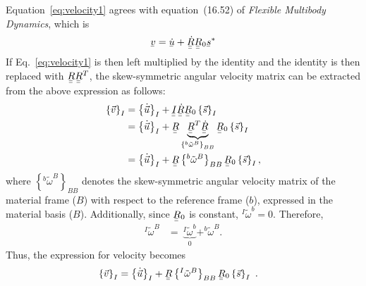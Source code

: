 \documentclass[a4paper]{article}
\newcommand{\ubar}[1]{\underaccent{\bar}{#1}}
\begin{document}
Equation~\eqref{eq:velocity1} agrees with equation~(16.52) of \textit{Flexible Multibody Dynamics}, which is
\begin{align}
  \ubar{v} = \ubar{\dot{u}} + \ubar{\ubar{\dot{R}}} \ubar{\ubar{R}}_{0} \ubar{s}^{*}
  \label{eq:16521}
\end{align}
If Eq.~\eqref{eq:velocity1} is then left multiplied by the identity and the identity is then replaced with $\ubar{\ubar{R}}\ubar{\ubar{R}}^{T}$, the skew-symmetric angular velocity matrix can be extracted from the above expression as follows:
\begin{align}
  \left\{ \vec{v} \right\}_{I} 
  &=  \left\{ \dot{ \vec{u}}\right\}_{I}
  + \ubar{\ubar{I}} \ubar{\ubar{\dot{R}}} \ubar{\ubar{R}}_{0} \left\{ \vec{s} \right\}_{I}  \\
  &=  \left\{ \dot{ \vec{u}}\right\}_{I} + \ubar{\ubar{R}} 
  \underbrace{\ubar{\ubar{R}}^{T} \ubar{\ubar{\dot{R}}}}_{\left\{^{b}\tilde{\omega}^{B}\right\}_{BB}} \ubar{\ubar{R}}_{0} \left\{ \vec{s} \right\}_{I}  \\
  &= \left\{ \dot{ \vec{u}}\right\}_{I}
  + \ubar{\ubar{R}} \left\{ ^{b}\tilde{\omega}^{B} \right\}_{BB} \ubar{\ubar{R}}_{0}  \left\{ \vec{s} \right\}_{I},
\end{align}
where $\left\{ ^{b}\tilde{\omega}^{B} \right\}_{BB}$ denotes the skew-symmetric angular velocity matrix of the material frame ($B$) with respect to the reference frame ($b$), expressed in the material basis ($B$).  Additionally, since $ \ubar{\ubar{R}}_{0}$ is constant, $^{I}\tilde{\omega}^{b} = 0$.  Therefore, 
\begin{align}
  ^{I}\tilde{\omega}^{B} &= \ \underbrace{^{I}\tilde{\omega}^{b}}_{0} + ^{b}\tilde{\omega}^{B}.
\end{align}
Thus, the expression for velocity becomes
\begin{align}
  \left\{ \vec{v} \right\}_{I} 
  &= \left\{ \dot{ \vec{u}}\right\}_{I}
  + \ubar{\ubar{R}} \left\{ ^{I}\tilde{\omega}^{B} \right\}_{BB} \ubar{\ubar{R}}_{0}  \left\{ \vec{s} \right\}_{I} \ .
  \label{eq:velocitysimp}
\end{align}
\end{document}

